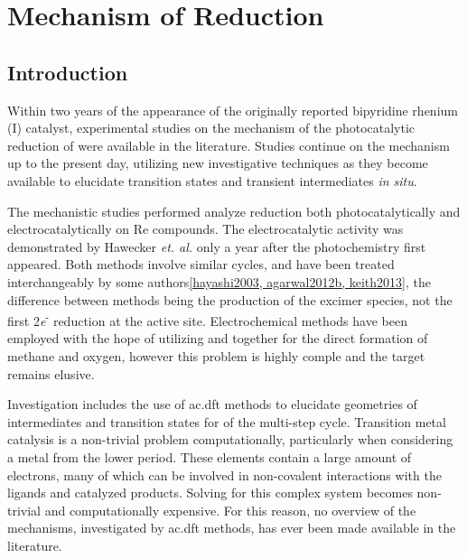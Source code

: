 \chapter{Mechanism of \texorpdfstring{}{CO2} Reduction}\label{chap.mech}

\section{Introduction}

Within two years of the appearance of the originally reported bipyridine rhenium (I) catalyst, experimental studies on the mechanism of the photocatalytic reduction of  were available in the literature\autocite{kutal1985, sullivan1985}. Studies continue on the mechanism up to the present day\autocite{johnson1996, koike2002, gibson2003, hayashi 2003, takeda2008, takeda2010, smieja2012, machan2014, kou2014}, utilizing new investigative techniques as they become available to elucidate transition states and transient intermediates \textit{in situ}. 

The mechanistic studies performed analyze  reduction both photocatalytically and electrocatalytically on Re compounds. The electrocatalytic activity was demonstrated by Hawecker \textit{et. al.} only a year after the photochemistry first appeared\autocite{hawecker1984}. Both methods involve similar cycles, and have been treated interchangeably by some authors\autoref{hayashi2003, agarwal2012b, keith2013}, the difference between methods being the production of the excimer species, not the first 2\textit{e}\textsuperscript{-} reduction at the active site. Electrochemical methods have been employed with the hope of utilizing  and  together for the direct formation of methane and oxygen, however this problem is highly comple and the target remains elusive\autocite{asatani2014}.

Investigation includes the use of \gls{ac.dft} methods to elucidate geometries of intermediates and transition states for of the multi-step cycle. Transition metal catalysis is a non-trivial problem computationally, particularly when considering a metal from the lower period. These elements contain a large amount of electrons, many of which can be involved in non-covalent interactions with the ligands and catalyzed products. Solving for this complex system becomes non-trivial and computationally expensive. For this reason, no overview of the mechanisms, investigated by \gls{ac.dft} methods, has ever been made available in the literature. 

